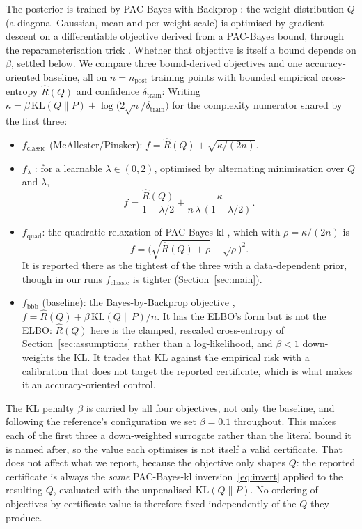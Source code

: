 The posterior is trained by PAC-Bayes-with-Backprop \parencite{perezortiz2021}:
the weight distribution $Q$ (a diagonal Gaussian, mean and per-weight scale) is
optimised by gradient descent on a differentiable objective derived from a
PAC-Bayes bound, through the reparameterisation trick \parencite{blundell2015}.
Whether that objective is itself a bound depends on $\beta$, settled below. We compare three
bound-derived objectives and one accuracy-oriented baseline, all on
$n=n_{\mathrm{post}}$ training points with bounded empirical cross-entropy
$\hat{R}(Q)$ and confidence $\delta_{\mathrm{train}}$:
Writing $\kappa=\beta\,\mathrm{KL}(Q\|P)+\log\big(2\sqrt{n}/\delta_{\mathrm{train}}\big)$
for the complexity numerator shared by the first three:
\begin{itemize}
\item \textbf{$f_{\text{classic}}$} (McAllester/Pinsker):
  $f=\hat{R}(Q)+\sqrt{\kappa/(2n)}$.
\item \textbf{$f_{\lambda}$} \parencite{thiemann2017}: for a learnable
  $\lambda\in(0,2)$, optimised by alternating minimisation over $Q$ and $\lambda$,
  \[
  f=\frac{\hat{R}(Q)}{1-\lambda/2}+\frac{\kappa}{n\,\lambda\,(1-\lambda/2)}.
  \]
\item \textbf{$f_{\text{quad}}$}: the quadratic relaxation of PAC-Bayes-kl
  \parencite{perezortiz2021}, which with $\rho=\kappa/(2n)$ is
  \[
  f=\Big(\sqrt{\hat{R}(Q)+\rho}+\sqrt{\rho}\Big)^{2}.
  \]
  It is reported there as the tightest of the three with a data-dependent prior,
  though in our runs $f_{\text{classic}}$ is tighter (Section~\ref{sec:main}).
\item \textbf{$f_{\text{bbb}}$} (baseline): the Bayes-by-Backprop objective
  \parencite{blundell2015}, $f=\hat{R}(Q)+\beta\,\mathrm{KL}(Q\|P)/n$. It has the
  ELBO's form but is not the ELBO: $\hat{R}(Q)$ here is the clamped, rescaled
  cross-entropy of Section~\ref{sec:assumptions} rather than a log-likelihood, and
  $\beta<1$ down-weights the KL. It trades that KL against the empirical risk with
  a calibration that does not target the reported certificate, which is what makes
  it an accuracy-oriented control.
\end{itemize}
The KL penalty $\beta$ is carried by all four objectives, not only the baseline,
and following the reference's configuration we set $\beta=0.1$ throughout. This
makes each of the first three a down-weighted surrogate rather than the literal
bound it is named after, so the value each optimises is not itself a valid
certificate. That does not affect what we report, because the objective only
shapes $Q$: the reported certificate is always the \emph{same} PAC-Bayes-kl
inversion~\eqref{eq:invert} applied to the resulting $Q$, evaluated with the
unpenalised $\mathrm{KL}(Q\|P)$. No ordering of objectives by certificate value
is therefore fixed independently of the $Q$ they produce.

